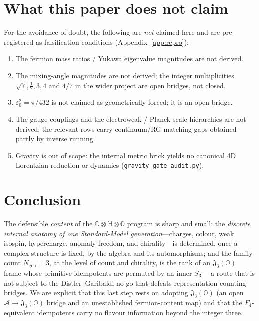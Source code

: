 \documentclass[11pt,a4paper]{article}
\theoremstyle{plain}
\newcommand{\CHO}{\mathbb{C}\otimes\mathbb{H}\otimes\mathbb{O}}
\newcommand{\Alg}{\mathcal{A}}
\newcommand{\JO}{\mathfrak{J}_3(\mathbb{O})}
\newcommand{\code}[1]{\texttt{#1}}
\newcommand{\epso}{\varepsilon_0}
\begin{document}
\section{What this paper does not claim}
\label{sec:not-claimed}

For the avoidance of doubt, the following are \emph{not} claimed here and are
pre-registered as falsification conditions (Appendix~\ref{app:repro}):

\begin{enumerate}[leftmargin=1.8em]
\item The fermion mass ratios / Yukawa eigenvalue magnitudes are not derived.
\item The mixing-angle magnitudes are not derived; the integer multiplicities
  $\sqrt{7}, \tfrac12, 3, 4$ and $4/7$ in the wider project are open bridges, not
  closed.
\item $\epso^2 = \pi/432$ is not claimed as geometrically forced; it is an open
  bridge.
\item The gauge couplings and the electroweak / Planck-scale hierarchies are not
  derived; the relevant rows carry continuum/RG-matching gaps obtained partly by
  inverse running.
\item Gravity is out of scope: the internal metric brick yields no canonical 4D
  Lorentzian reduction or dynamics (\code{gravity\_gate\_audit.py}).
\end{enumerate}

\section{Conclusion}
\label{sec:conclusion}

The defensible \emph{content} of the $\CHO$ program is sharp and small: the
\emph{discrete internal anatomy of one Standard-Model generation}---charges,
colour, weak isospin, hypercharge, anomaly freedom, and chirality---is determined,
once a complex structure is fixed, by the algebra and its automorphisms; and the
family count $N_{\mathrm{gen}}=3$, at the level of count and chirality, is the
rank of an $\JO$ frame whose primitive idempotents are permuted by an inner $S_3$
---a route that is not subject to the
Distler--Garibaldi no-go that defeats representation-counting bridges.
We are explicit that this last step rests on adopting $\JO$ (an open
$\Alg \to \JO$ bridge and an unestablished fermion-content map) and that the
$F_4$-equivalent idempotents carry no flavour information beyond the integer
three.
\end{document}
